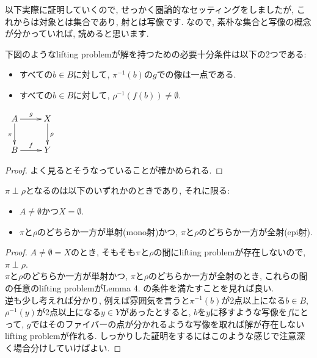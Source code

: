 \documentclass[. /main]{subfiles}
\begin{document}
以下実際に証明していくので, せっかく圏論的なセッティングをしましたが, これからは対象とは集合であり, 射とは写像です. なので, 素朴な集合と写像の概念が分かっていれば, 読めると思います. 
\begin{lemm}
下図のようなlifting problemが解を持つための必要十分条件は以下の2つである:
\begin{itemize}
\item すべての$b \in B$に対して, ${\pi}^{-1}(b)$の$g$での像は一点である. 
\item すべての$b \in B$に対して, ${\rho}^{-1}(f(b)) \neq \emptyset$. 
\end{itemize}

\begin{center}
$\xymatrix{
A \ar[d]_{\pi} \ar[r]^g \ar@{}[dr] & X \ar[d]^{\rho} \\
B \ar[r]^f & Y \\
}$
\end{center}
\end{lemm}
\begin{proof}
よく見るとそうなっていることが確かめられる. 
\end{proof}

\begin{lemm}
$\pi \perp \rho$となるのは以下のいずれかのときであり, それに限る:
\begin{itemize}
\item $A \neq \emptyset$かつ$X=\emptyset$.
\item $\pi$と$\rho$のどちらか一方が単射(mono射)かつ, $\pi$と$\rho$のどちらか一方が全射(epi射). 
\end{itemize}
\end{lemm}
\begin{proof}
$A \neq \emptyset = X$のとき, そもそも$\pi$と$\rho$の間にlifting problemが存在しないので, $\pi \perp \rho$. \\
$\pi$と$\rho$のどちらか一方が単射かつ, $\pi$と$\rho$のどちらか一方が全射のとき, これらの間の任意のlifting problemがLemma 4. の条件を満たすことを見れば良い. \\
逆も少し考えれば分かり, 例えば雰囲気を言うと${\pi}^{-1}(b)$が2点以上になる$b \in B$, ${\rho}^{-1}(y)$が2点以上になる$y \in Y$があったとすると, $b$を$y$に移すような写像を$f$にとって, $g$ではそのファイバーの点が分かれるような写像を取れば解が存在しないlifting problemが作れる. しっかりした証明をするにはこのような感じで注意深く場合分けしていけばよい. 
\end{proof}
\end{document}
